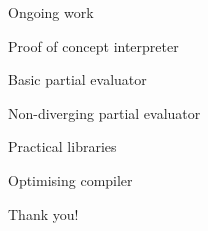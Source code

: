%
%

\begin{frame}[fragile]{Ongoing work}
\begin{todolist}
  \item[\done] Proof of concept interpreter
  \item[\done] Basic partial evaluator
  \item Non-diverging partial evaluator
  \item Practical libraries
  \item Optimising compiler
\end{todolist}
\end{frame}

\begin{frame}
\begin{center}
\Huge Thank you!
\end{center}
\end{frame}


